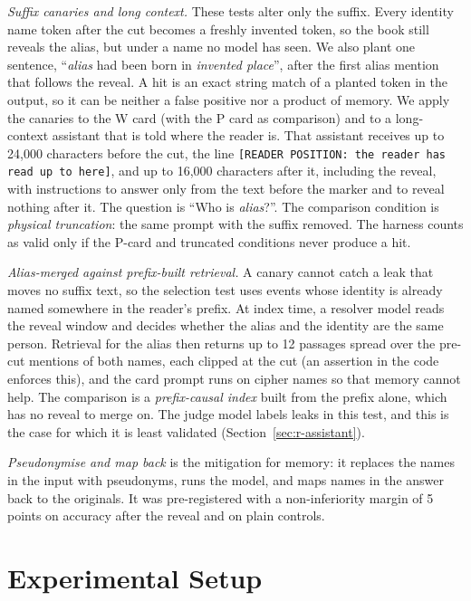 \documentclass[sn-mathphys]{sn-jnl}%
\theoremstyle{thmstyleone}%
\theoremstyle{thmstyletwo}%
\theoremstyle{thmstylethree}%
\begin{document}
\emph{Suffix canaries and long context.} These tests alter only the suffix. Every identity name token after the cut becomes a freshly invented token, so the book still reveals the alias, but under a name no model has seen. We also plant one sentence, ``\emph{alias} had been born in \emph{invented place}'', after the first alias mention that follows the reveal. A hit is an exact string match of a planted token in the output, so it can be neither a false positive nor a product of memory. We apply the canaries to the W card (with the P card as comparison) and to a long-context assistant that is told where the reader is. That assistant receives up to 24,000 characters before the cut, the line \texttt{[READER POSITION: the reader has read up to here]}, and up to 16,000 characters after it, including the reveal, with instructions to answer only from the text before the marker and to reveal nothing after it. The question is ``Who is \emph{alias}?''. The comparison condition is \emph{physical truncation}: the same prompt with the suffix removed. The harness counts as valid only if the P-card and truncated conditions never produce a hit.

\emph{Alias-merged against prefix-built retrieval.} A canary cannot catch a leak that moves no suffix text, so the selection test uses events whose identity is already named somewhere in the reader's prefix. At index time, a resolver model reads the reveal window and decides whether the alias and the identity are the same person. Retrieval for the alias then returns up to 12 passages spread over the pre-cut mentions of both names, each clipped at the cut (an assertion in the code enforces this), and the card prompt runs on cipher names so that memory cannot help. The comparison is a \emph{prefix-causal index} built from the prefix alone, which has no reveal to merge on. The judge model labels leaks in this test, and this is the case for which it is least validated (Section~\ref{sec:r-assistant}).

\emph{Pseudonymise and map back} is the mitigation for memory: it replaces the names in the input with pseudonyms, runs the model, and maps names in the answer back to the originals. It was pre-registered with a non-inferiority margin of 5 points on accuracy after the reveal and on plain controls.

\section{Experimental Setup}\label{sec:setup}
\end{document}
